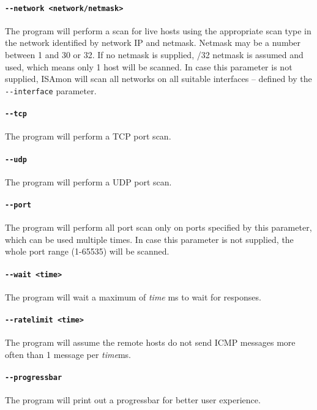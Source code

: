 \documentclass[11pt,a4paper]{article}
\begin{document}
		\paragraph{\texttt{-{}-network <network/netmask>}} The program will perform a scan for live hosts using the appropriate scan type in the network identified by network IP and netmask. Netmask may be a number between 1 and 30 or 32. If no netmask is supplied, /32 netmask is assumed and used, which means only 1 host will be scanned. In case this parameter is not supplied, ISAmon will scan all networks on all suitable interfaces -- defined by the \texttt{-{}-interface} parameter.
		\vspace{-0.5cm}
		\paragraph{\texttt{-{}-tcp}} The program will perform a TCP port scan.
		\vspace{-0.5cm}
		\paragraph{\texttt{-{}-udp}} The program will perform a UDP port scan.
		\vspace{-0.5cm}
		\paragraph{\texttt{-{}-port}} The program will perform all port scan only on ports specified by this parameter, which can be used multiple times. In case this parameter is not supplied, the whole port range (1-65535) will be scanned.
		\vspace{-0.5cm}
		\paragraph{\texttt{-{}-wait <time>}} The program will wait a maximum of \emph{time} ms to wait for responses.
		\vspace{-0.5cm}
		\paragraph{\texttt{-{}-ratelimit <time>}} The program will assume the remote hosts do not send ICMP messages more often than 1 message per \emph{time}ms.
		\paragraph{\texttt{-{}-progressbar}} The program will print out a progressbar for better user experience.
		
\end{document}
